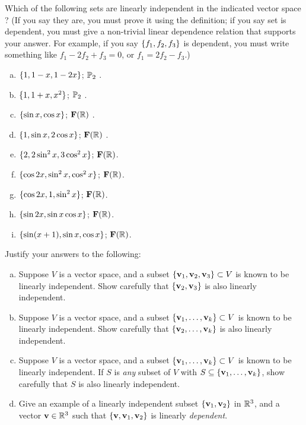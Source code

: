 \begin{prob}
\end{prob} \begin{prob} \label{prob07.3} Which of the following sets are linearly independent in the indicated vector space ? (If you say they are, you must prove it using the definition; if you say   set is dependent, you must give a non-trivial linear dependence relation that supports your answer. For example, if you say $\{f_1, f_2, f_3 \}$ is dependent, you must write something like  $f_1-2 f_2 +f_3=0$, or $f_1=2 f_2 -f_3$.)
\medskip
\begin{enumerate}[a)]
\item  $\{1, 1-x, 1-2x \}$;  $\mathbb{P}_2$ . \medskip
%
\item\sov  $\{1, 1+x, x^2 \}$;  $\mathbb{P}_2$ . \medskip 
%
\item  $\{ \sin x,  \cos x \}$;  $\mathbf{F}(\mathbb{R})$ . \medskip  
%
\item\sov  $\{1, \sin x, 2 \cos x \}$;  $\mathbf{F}(\mathbb{R})$ . \medskip  
%
\item  $\{2, 2\sin^2 x,  3\cos^2 x \}$;  $\mathbf{F}(\mathbb{R})$. \medskip  
%
\item\sov  $\{\cos 2x, \sin^2 x,  \cos^2 x \}$;  $\mathbf{F}(\mathbb{R})$. \medskip  
%
\item  $\{\cos 2x, 1,  \sin^2 x \}$;  $\mathbf{F}(\mathbb{R})$. \medskip  
%
\item\sov  $\{\sin 2x, \sin x \cos x  \}$;  $\mathbf{F}(\mathbb{R})$. \medskip  
%
\item  $\{\sin(x+1), \sin x, \cos x  \}$;  $\mathbf{F}(\mathbb{R})$. \medskip  
%
\end{enumerate}
\end{prob} \begin{prob} \label{prob07.4} Justify your answers to the following:\medskip 

\begin{enumerate}[a)]
\item Suppose $V$ is a vector space, and a  subset $\{\mathbf{v}_1, \mathbf{v}_2 , \mathbf{v}_3 \}\subset V$ is known to be linearly independent.  Show carefully that $\{\mathbf{v}_2 , \mathbf{v}_3 \}$ is also   linearly independent.\medskip

\item\sov Suppose $V$ is a vector space, and a   subset $\{\mathbf{v}_1, \dots , \mathbf{v}_k \}\subset V$ is known to be linearly independent. Show carefully that $ \{\mathbf{v}_2, \dots , \mathbf{v}_k \}$ is also   linearly independent.\medskip
 

\item Suppose $V$ is a vector space, and a  subset $\{\mathbf{v}_1, \dots , \mathbf{v}_k \}\subset V$ is known to be linearly independent. If $S$ is {\it any}   subset of $V$ with $S \subseteq \{\mathbf{v}_1, \dots , \mathbf{v}_k \}$, show carefully that $S$ is also   linearly independent.\medskip
\item\sov Give an example of a linearly independent subset $\{\mathbf{v}_1, \mathbf{v}_2 \}$ in $\mathbb{R}^3$, and a vector $\mathbf{v}\in  \mathbb{R}^3$ such that $\{\mathbf{v}, \mathbf{v}_1, \mathbf{v}_2 \}$ is  linearly {\it dependent}.
%
\medskip
%


\end{enumerate}
\end{prob}
